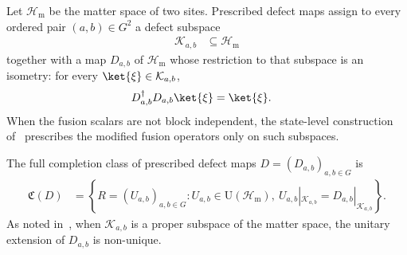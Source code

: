 \begin{definition}
    \label{def:mpug_defect_maps}
    \leanok
    Let $\mathcal H_{\mathrm m}$ be the matter space of two sites. Prescribed
    defect maps assign to every ordered pair $(a,b)\in G^2$ a defect subspace
    \begin{align}
        \mathcal K_{a,b} & \subseteq\mathcal H_{\mathrm m}
    \end{align}
    together with a map $D_{a,b}$ of $\mathcal H_{\mathrm m}$ whose
    restriction to that subspace is an isometry: for every
    $\ket{\xi}\in\mathcal K_{a,b}$,
    \begin{align}
        D_{a,b}^\dagger D_{a,b}\ket{\xi}
         & =\ket{\xi}.
        \label{eq:mpug_defect_isometry}
    \end{align}
    When the fusion scalars are not block independent, the state-level
    construction of~\cite[lines~4215--4326]{FrancoRubio2025MPUGauging}
    prescribes the modified fusion operators only on such subspaces.
\end{definition}

\begin{definition}
    \label{def:mpug_completion_class}
    \leanok
    The full completion class of prescribed defect maps
    $D=(D_{a,b})_{a,b\in G}$ is
    \begin{align}
        \mathfrak C(D)
         & =\left\{R=(U_{a,b})_{a,b\in G}:
        U_{a,b}\in\mathrm U(\mathcal H_{\mathrm m}),\
        U_{a,b}|_{\mathcal K_{a,b}}=D_{a,b}|_{\mathcal K_{a,b}}\right\}.
        \label{eq:mpug_completion_class}
    \end{align}
    As noted in~\cite[lines~4215--4326]{FrancoRubio2025MPUGauging}, when
    $\mathcal K_{a,b}$ is a proper subspace of the matter space, the unitary
    extension of $D_{a,b}$ is non-unique.
\end{definition}

